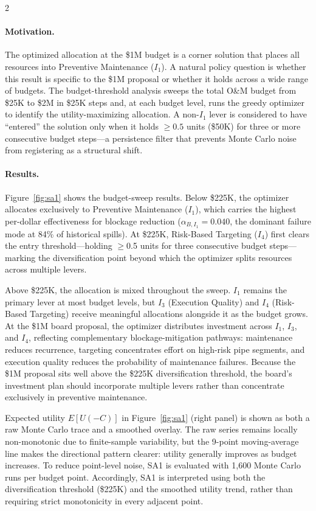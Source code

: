 \documentclass[10pt]{article}
\begin{document}
\begin{multicols}{2}
\paragraph{Motivation.}
The optimized allocation at the \$1M budget is a corner solution that
places all resources into Preventive Maintenance ($I_1$). A natural
policy question is whether this result is specific to the \$1M
proposal or whether it holds across a wide range of budgets. The
budget-threshold analysis sweeps the total O\&M budget from \$25K
to \$2M in \$25K steps and, at each budget level, runs the greedy
optimizer to identify the utility-maximizing allocation. A non-$I_1$
lever is considered to have ``entered'' the solution only when it
holds $\geq 0.5$ units (\$50K) for three or more consecutive budget
steps---a persistence filter that prevents Monte Carlo noise from
registering as a structural shift.

\paragraph{Results.}
Figure~\ref{fig:sa1} shows the budget-sweep results. Below \$225K,
the optimizer allocates exclusively to Preventive Maintenance ($I_1$),
which carries the highest per-dollar effectiveness for blockage
reduction ($\alpha_{B,I_1} = 0.040$, the dominant failure mode at
84\% of historical spills). At \$225K, Risk-Based Targeting ($I_4$)
first clears the entry threshold---holding $\geq$0.5 units for three
consecutive budget steps---marking the diversification point beyond
which the optimizer splits resources across multiple levers.

Above \$225K, the allocation is mixed throughout the sweep. $I_1$
remains the primary lever at most budget levels, but $I_3$ (Execution
Quality) and $I_4$ (Risk-Based Targeting) receive meaningful
allocations alongside it as the budget grows. At the \$1M board
proposal, the optimizer distributes investment across $I_1$, $I_3$,
and $I_4$, reflecting complementary blockage-mitigation pathways:
maintenance reduces recurrence, targeting concentrates effort on
high-risk pipe segments, and execution quality reduces the probability
of maintenance failures. Because the \$1M proposal sits well above
the \$225K diversification threshold, the board's investment plan
should incorporate multiple levers rather than concentrate
exclusively in preventive maintenance.

Expected utility $E[U(-C)]$ in Figure~\ref{fig:sa1} (right panel) is
shown as both a raw Monte Carlo trace and a smoothed overlay. The raw
series remains locally non-monotonic due to finite-sample variability,
but the 9-point moving-average line makes the directional pattern
clearer: utility generally improves as budget increases. To reduce
point-level noise, SA1 is evaluated with 1{,}600 Monte Carlo runs per
budget point. Accordingly, SA1 is interpreted using both the
diversification threshold (\$225K) and the smoothed utility trend,
rather than requiring strict monotonicity in every adjacent point.


\end{multicols}
\end{document}

